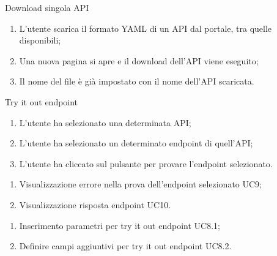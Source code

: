 \begin{usecase}{7}{Download singola API}\label{uc:download-singola-api}

    \usecasemain{}
        \begin{enumerate}
            \item L'utente scarica il formato YAML di un API dal portale, tra quelle disponibili;
            \item Una nuova pagina si apre e il download dell'API viene eseguito;
            \item Il nome del file è già impostato con il nome dell'API scaricata.
        \end{enumerate}

\end{usecase}


\begin{usecase}{8}{Try it out endpoint}\label{uc:try-it-out-endpoint}
    \usecasemain{}
        \begin{enumerate}
            \item L'utente ha selezionato una determinata API;
            \item L'utente ha selezionato un determinato endpoint di quell'API;
            \item L'utente ha cliccato sul pulsante per provare l'endpoint selezionato.
        \end{enumerate}

    \usecaseext{}
        \begin{enumerate}
            \item Visualizzazione errore nella prova dell'endpoint selezionato UC9;
            \item Visualizzazione risposta endpoint UC10.
        \end{enumerate}

        \begin{enumerate}
            \item Inserimento parametri per try it out endpoint UC8.1;
            \item Definire campi aggiuntivi per try it out endpoint UC8.2.
        \end{enumerate}

\end{usecase}


